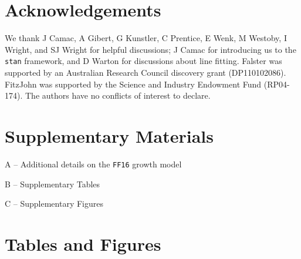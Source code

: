 \documentclass[a4paper,11pt]{article}
\begin{document}
\section{Acknowledgements}

We thank J Camac, A Gibert, G Kunstler, C Prentice, E Wenk, M Westoby, I Wright, and SJ Wright for helpful discussions; J Camac for introducing us to the \texttt{stan} framework, and D Warton for discussions about {\sma} line fitting. Falster was supported by an Australian Research Council discovery grant (DP110102086). FitzJohn was supported by the Science and Industry Endowment Fund (RP04-174). The authors have no conflicts of interest to declare.

\section{Supplementary Materials}

\noindent A -- Additional details on the \texttt{FF16} growth model

\noindent B -- Supplementary Tables

\noindent C -- Supplementary Figures

\vspace{10em}

\section{Tables and Figures}


\newpage
\end{document}
